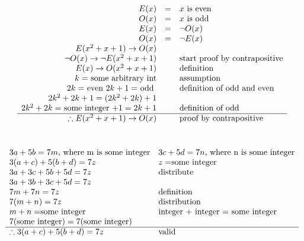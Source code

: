 \documentclass[letterpaper]{article}
\begin{document}
	\section{}
    	\begin{displaymath}
    		\begin{array}{rll}
    			E(x) &=& x $ is even$\\
                O(x) &=& x $ is odd$\\
                E(x) &=& \neg O(x)\\
                O(x) &=& \neg E(x)\\
                E(x^2 + x + 1) \rightarrow O(x) &&\\
                \neg O(x) \rightarrow \neg E(x^2 + x + 1) && $start proof by contrapositive$\\
                E(x) \rightarrow O(x^2 + x + 1) && $definition$\\
                k = $ some arbitrary int$ && $assumption$\\
                2k = $ even $ 2k + 1 = $ odd $ && $definition of odd and even$\\
               	2k^2 + 2k + 1 = (2k^2 + 2k) + 1 &&\\
                2k^2 + 2k = $ some integer $ + 1 = 2k + 1 && $definition of odd$\\
                \hline
                \therefore E(x^2 + x + 1) \rightarrow O(x) && $proof by contrapositive$\\
    		\end{array}
    	\end{displaymath}
	\section{}
    	\begin{displaymath}
    		\begin{array}{ll}
            	3a + 5b = 7m $, where m is some integer$ & 3c + 5d = 7n $, where n is some integer$\\
                3(a + c) + 5(b + d) = 7z & z = $some integer$\\
                3a + 3c + 5b + 5d = 7z & $distribute$\\
                3a + 3b + 3c + 5d = 7z & \\
                7m + 7n = 7z & $definition$\\
                7(m + n) = 7z & $distribution$\\
                m + n = $some integer$ & $integer + integer = some integer$\\
                7($some integer$) = 7 ($some integer$) &\\ 
                \hline
                \therefore 3(a + c) + 5(b+d) = 7z & $valid$\\
    		\end{array}
    	\end{displaymath}
\end{document}

